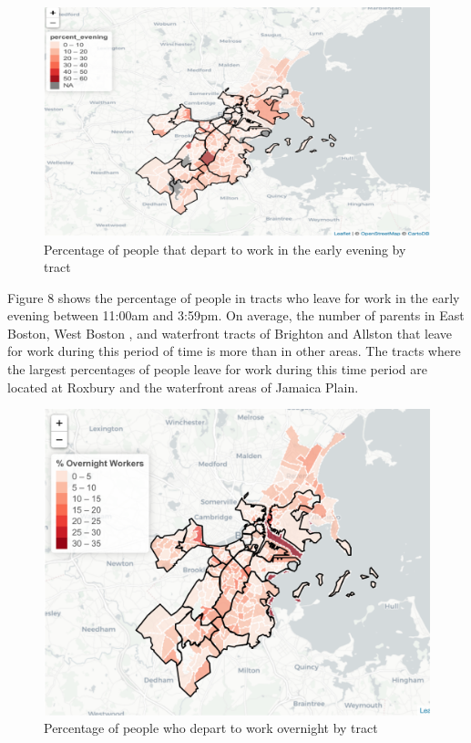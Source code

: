 \documentclass[10pt,letterpaper]{article}
\begin{document}
\begin{figure}

{\centering \includegraphics[width=1\linewidth]{fig5} 

}

\caption{Percentage of people that depart to work in the early evening by tract}\label{fig:unnamed-chunk-10}
\end{figure}

Figure 8 shows the percentage of people in tracts who leave for work in
the early evening between 11:00am and 3:59pm. On average, the number of
parents in East Boston, West Boston , and waterfront tracts of Brighton
and Allston that leave for work during this period of time is more than
in other areas. The tracts where the largest percentages of people leave
for work during this time period are located at Roxbury and the
waterfront areas of Jamaica Plain.

\begin{figure}

{\centering \includegraphics[width=1\linewidth]{fig6_percent_overnight} 

}

\caption{Percentage of people who depart to work overnight by tract}\label{fig:unnamed-chunk-11}
\end{figure}
\end{document}
